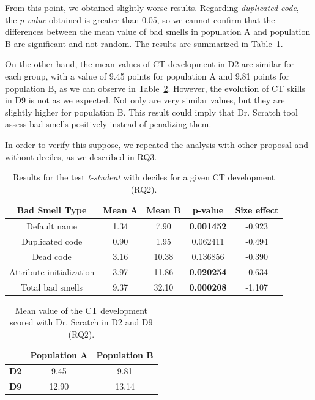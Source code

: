 From this point, we obtained slightly worse results. Regarding \textit{duplicated code}, the \textit{p-value} obtained is greater than 0.05, so we cannot confirm that the differences between the mean value of bad smells in population A and population B are significant and not random.  The results are summarized in Table~\ref{table:rq2_statistical_results}.

On the other hand, the mean values of CT development in D2 are similar for each group, with a value of 9.45 points for population A and 9.81 points for population B, as we can observe in Table~\ref{table:rq2_statistical_results_mean}. However, the evolution of CT skills in D9 is not as we expected. Not only are very similar values, but they are slightly higher for population B. This result could imply that Dr. Scratch tool assess bad smells positively instead of penalizing them.

In order to verify this suppose, we repeated the analysis with other proposal and without deciles, as we described in RQ3.

\begin{table}
 \begin{center}
  \begin{tabular}{|c|c|c|c|c|}
    \hline
    \textbf{Bad Smell Type} & \textbf{Mean A} & \textbf{Mean B} & \textbf{p-value} & \textbf{Size effect} \\ \hline
    Default name & 1.34 & 7.90 & \textbf{0.001452} & -0.923 \\ \hline
    Duplicated code & 0.90 & 1.95 & 0.062411 & -0.494 \\ \hline
    Dead code & 3.16 & 10.38 & 0.136856 & -0.390 \\ \hline
    Attribute initialization & 3.97 & 11.86 & \textbf{0.020254} & -0.634 \\ \hline
    Total bad smells & 9.37 & 32.10 & \textbf{0.000208} & -1.107 \\ \hline
  \end{tabular}
  \caption{Results for the test \textit{t-student} with deciles for a given CT development (RQ2).}
  \label{table:rq2_statistical_results}
 \end{center}
\end{table}

\begin{table}
 \begin{center}
  \begin{tabular}{|c|c|c|}
    \hline
     & \textbf{Population A} & \textbf{Population B} \\ \hline
    \textbf{D2} & 9.45 & 9.81 \\ \hline
    \textbf{D9} & 12.90 & 13.14 \\ \hline
  \end{tabular}
  \caption{Mean value of the CT development scored with Dr. Scratch in D2 and D9 (RQ2).}
  \label{table:rq2_statistical_results_mean}
 \end{center}
\end{table}




